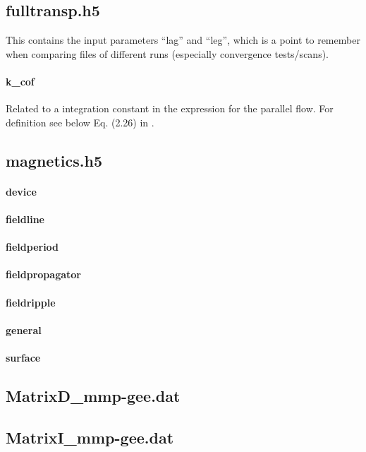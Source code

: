 \subsection{fulltransp.h5}
This contains the input parameters ``lag'' and ``leg'', which is a point
to remember when comparing files of different runs (especially
convergence tests/scans).

\paragraph{k\_cof}
Related to a integration constant in the expression for the parallel
flow. For definition see below Eq. (2.26) in \cite{Martitsch:Thesis:16}.

\subsection{magnetics.h5}
\paragraph{device}
\paragraph{fieldline}
\paragraph{fieldperiod}
\paragraph{fieldpropagator}
\paragraph{fieldripple}
\paragraph{general}
\paragraph{surface}

\subsection{MatrixD\_mmp-gee.dat}
\subsection{MatrixI\_mmp-gee.dat}
